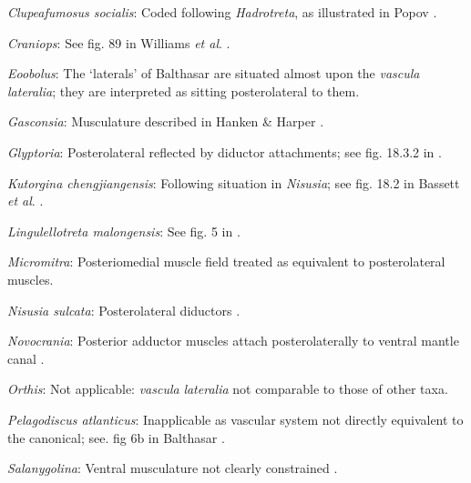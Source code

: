 \documentclass[openany]{book}
\theoremstyle{definition}
\theoremstyle{definition}
\theoremstyle{definition}
\theoremstyle{remark}
\begin{document}
\hypertarget{Clupeafumosus_socialis-coding-15}{}
\emph{Clupeafumosus socialis}: Coded following \emph{Hadrotreta}, as
illustrated in Popov \citeyearpar{Popov1992TheCambrian}.

\hypertarget{Craniops-coding-15}{}
\emph{Craniops}: See fig. 89 in Williams \emph{et al}.
\citeyearpar{Williams2000LinguliformeaCraniiformea}.

\hypertarget{Eoobolus-coding-15}{}
\emph{Eoobolus}: The `laterals' of Balthasar \citeyearpar[fig.
5]{Balthasar2009Thebrachiopod} are situated almost upon the
\emph{vascula} \emph{lateralia}; they are interpreted as sitting
posterolateral to them.

\hypertarget{Gasconsia-coding-15}{}
\emph{Gasconsia}: Musculature described in Hanken \& Harper
\citeyearpar{Hanken1985Thetaxonomy}.

\hypertarget{Glyptoria-coding-15}{}
\emph{Glyptoria}: Posterolateral reflected by diductor attachments; see
fig. 18.3.2 in \citet{Bassett2001Functionalmorphology}.

\hypertarget{Kutorgina_chengjiangensis-coding-15}{}
\emph{Kutorgina chengjiangensis}: Following situation in \emph{Nisusia};
see fig. 18.2 in Bassett \emph{et al}.
\citeyearpar{Bassett2001Functionalmorphology}.

\hypertarget{Lingulellotreta_malongensis-coding-15}{}
\emph{Lingulellotreta malongensis}: See fig. 5 in
\citet{Holmer1997EarlyCambrian}.

\hypertarget{Micromitra-coding-15}{}
\emph{Micromitra}: Posteriomedial muscle field \citep[text-fig.
6]{Williams1998Thediversity} treated as equivalent to posterolateral
muscles.

\hypertarget{Nisusia_sulcata-coding-15}{}
\emph{Nisusia sulcata}: Posterolateral diductors \citep[fig. 18.2
in][]{Bassett2001Functionalmorphology}.

\hypertarget{Novocrania-coding-15}{}
\emph{Novocrania}: Posterior adductor muscles attach posterolaterally to
ventral mantle canal \citep{Robinson2014Themuscles}.

\hypertarget{Orthis-coding-15}{}
\emph{Orthis}: Not applicable: \emph{vascula} \emph{lateralia} not
comparable to those of other taxa.

\hypertarget{Pelagodiscus_atlanticus-coding-15}{}
\emph{Pelagodiscus atlanticus}: Inapplicable as vascular system not
directly equivalent to the canonical; see. fig 6b in Balthasar
\citeyearpar{Balthasar2009Thebrachiopod}.

\hypertarget{Salanygolina-coding-15}{}
\emph{Salanygolina}: Ventral musculature not clearly constrained
\citep{Holmer2009Theenigmatic}.
\end{document}
